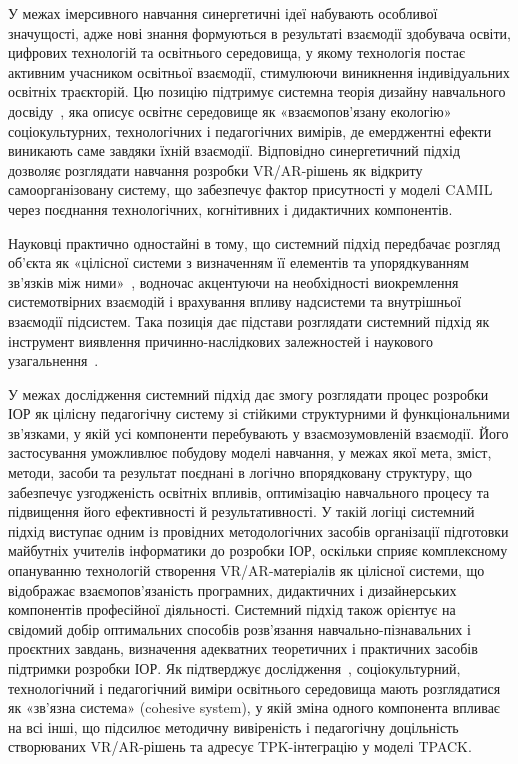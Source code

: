 У межах імерсивного навчання синергетичні ідеї набувають особливої значущості, адже нові знання формуються в результаті взаємодії здобувача освіти, цифрових технологій та освітнього середовища, у якому технологія постає активним учасником освітньої взаємодії, стимулюючи виникнення індивідуальних освітніх траєкторій. Цю позицію підтримує системна теорія дизайну навчального досвіду~\cite{Schmidt2024EntangledLXD}, яка описує освітнє середовище як «взаємопов'язану екологію» соціокультурних, технологічних і педагогічних вимірів, де емерджентні ефекти виникають саме завдяки їхній взаємодії. Відповідно синергетичний підхід дозволяє розглядати навчання розробки VR/AR-рішень як відкриту самоорганізовану систему, що забезпечує фактор присутності у моделі CAMIL через поєднання технологічних, когнітивних і дидактичних компонентів.

Науковці практично одностайні в тому, що системний підхід передбачає розгляд об'єкта як «цілісної системи з визначенням її елементів та упорядкуванням зв'язків між ними»~\cite[c.~46]{Kuzminskyi2012Pedagogy}, водночас акцентуючи на необхідності виокремлення системотвірних взаємодій і врахування впливу надсистеми та внутрішньої взаємодії підсистем. Така позиція дає підстави розглядати системний підхід як інструмент виявлення причинно-наслідкових залежностей і наукового узагальнення~\cite{Goncharenko2011Pedagogy}.

У межах дослідження системний підхід дає змогу розглядати процес розробки ІОР як цілісну педагогічну систему зі стійкими структурними й функціональними зв'язками, у якій усі компоненти перебувають у взаємозумовленій взаємодії. Його застосування уможливлює побудову моделі навчання, у межах якої мета, зміст, методи, засоби та результат поєднані в логічно впорядковану структуру, що забезпечує узгодженість освітніх впливів, оптимізацію навчального процесу та підвищення його ефективності й результативності. У такій логіці системний підхід виступає одним із провідних методологічних засобів організації підготовки майбутніх учителів інформатики до розробки ІОР, оскільки сприяє комплексному опануванню технологій створення VR/AR-матеріалів як цілісної системи, що відображає взаємопов'язаність програмних, дидактичних і дизайнерських компонентів професійної діяльності. Системний підхід також орієнтує на свідомий добір оптимальних способів розв'язання навчально-пізнавальних і проєктних завдань, визначення адекватних теоретичних і практичних засобів підтримки розробки ІОР. Як підтверджує дослідження~\cite{Schmidt2024EntangledLXD}, соціокультурний, технологічний і педагогічний виміри освітнього середовища мають розглядатися як «зв'язна система» (cohesive system), у якій зміна одного компонента впливає на всі інші, що підсилює методичну вивіреність і педагогічну доцільність створюваних VR/AR-рішень та адресує TPK-інтеграцію у моделі TPACK.

